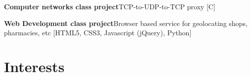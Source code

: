 \documentclass[11pt,a4paper,sans]{moderncv} %
\begin{document}
 {\textbf{Computer networks class project}\newline TCP-to-UDP-to-TCP proxy [C]}

 {\textbf{Web Development class project}\newline Browser based service for geolocating shops, pharmacies, etc [HTML5, CSS3, Javascript (jQuery), Python]}







\section{Interests}

\renewcommand{\listitemsymbol}{-~} %





\end{document}
